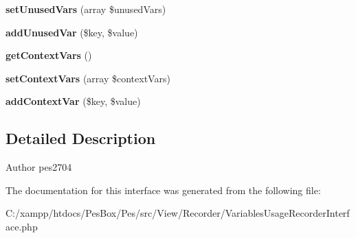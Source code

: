 \begin{DoxyCompactItemize}
\mbox{\label{interface_pes_1_1_view_1_1_recorder_1_1_variables_usage_recorder_interface_a12ee3752df371a31c7ab5b30a6008623}} 
{\bfseries set\+Unused\+Vars} (array \$unused\+Vars)
\item 
\mbox{\label{interface_pes_1_1_view_1_1_recorder_1_1_variables_usage_recorder_interface_afbb764fa4db43f9e9849f6607fd8651c}} 
{\bfseries add\+Unused\+Var} (\$key, \$value)
\item 
\mbox{\label{interface_pes_1_1_view_1_1_recorder_1_1_variables_usage_recorder_interface_a88a90dc46c264490077d87ebc2add8f4}} 
{\bfseries get\+Context\+Vars} ()
\item 
\mbox{\label{interface_pes_1_1_view_1_1_recorder_1_1_variables_usage_recorder_interface_ac48f88e2466b1d82230ffa533533d221}} 
{\bfseries set\+Context\+Vars} (array \$context\+Vars)
\item 
\mbox{\label{interface_pes_1_1_view_1_1_recorder_1_1_variables_usage_recorder_interface_aa1c18ca804538b2751c0b84f7205e942}} 
{\bfseries add\+Context\+Var} (\$key, \$value)
\end{DoxyCompactItemize}


\subsection{Detailed Description}
\begin{DoxyAuthor}{Author}
pes2704 
\end{DoxyAuthor}


The documentation for this interface was generated from the following file\+:\begin{DoxyCompactItemize}
\item 
C\+:/xampp/htdocs/\+Pes\+Box/\+Pes/src/\+View/\+Recorder/Variables\+Usage\+Recorder\+Interface.\+php\end{DoxyCompactItemize}
